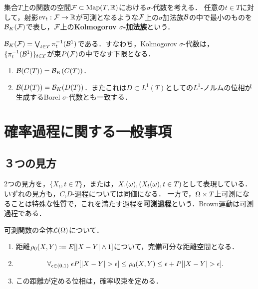 \documentclass[uplatex,dvipdfmx]{jsreport}
\begin{document}
\begin{definition}
    集合$T$上の関数の空間$\mathcal{F}\subset\mathrm{Map}(T,\mathbb{R})$における$\sigma$-代数を考える．
    任意の$t\in T$に対して，射影$\mathrm{ev}_t:\mathcal{F}\to\mathbb{R}$が可測となるような$\mathcal{F}$上の$\sigma$加法族$\mathcal{B}$の中で最小のものを$\mathcal{B}_K(\mathcal{F})$で表し，$\mathcal{F}$上の\textbf{Kolmogorov $\sigma$-加法族}という．
\end{definition}

\begin{lemma}
    $\mathcal{B}_K(\mathcal{F})=\bigvee_{t\in T}\pi^{-1}_t(\mathcal{B}^1)$である．すなわち，Kolmogorov $\sigma$-代数は，$\{\pi^{-1}_t(\mathcal{B}^1)\}_{t\in T}$が束$P(\mathcal{F})$の中でなす下限となる．
\end{lemma}

\begin{theorem}\mbox{}
    \begin{enumerate}
        \item $\mathcal{B}(C(T))=\mathcal{B}_K(C(T))$．
        \item $\mathcal{B}(D(T))=\mathcal{B}_K(D(T))$．またこれは$D\subset L^1(T)$としての$L^1$-ノルムの位相が生成するBorel $\sigma$-代数とも一致する．
    \end{enumerate}
\end{theorem}

\section{確率過程に関する一般事項}

\subsection{３つの見方}

\begin{tcolorbox}[colframe=ForestGreen, colback=ForestGreen!10!white,breakable,colbacktitle=ForestGreen!40!white,coltitle=black,fonttitle=\bfseries\sffamily,
title=]
    2つの見方を，$\{X_t,t\in T\}$，または，$X.(\omega),(X_t(\omega),t\in T)$として表現している．
    いずれの見方も，$C$,$D$-過程については同値になる．
    一方で，$\Omega\times T$上可測になることは特殊な性質で，これを満たす過程を\textbf{可測過程}という．Brown運動は可測過程である．
\end{tcolorbox}

\begin{lemma}
    可測関数の全体$\mathcal{L}(\Omega)$について．
    \begin{enumerate}
        \item 距離$\rho_0(X,Y):=E[\lvert X-Y\rvert\land 1]$について，完備可分な距離空間となる．
        \item \[\forall_{\epsilon\in(0,1)}\;\epsilon P[\lvert X-Y\rvert>\epsilon]\le\rho_0(X,Y)\le\epsilon+P[\lvert X-Y\rvert>\epsilon].\]
        \item この距離が定める位相は，確率収束を定める．
    \end{enumerate}
\end{lemma}
\end{document}
